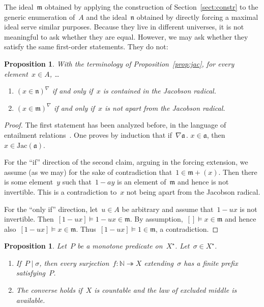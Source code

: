 \documentclass[com,11pt,crcready]{iosart2x}
\theoremstyle{definition}
\theoremstyle{plain}
\newtheorem{proposition}[definition]{Proposition}
\theoremstyle{remark}
\newcommand{\?}{\,{:}\,}
\newcommand{\aaa}{\mathfrak{a}}
\newcommand{\mmm}{\mathfrak{m}}
\newcommand{\nnn}{\mathfrak{n}}
\newcommand{\NN}{\mathbb{N}}
\renewcommand{\_}{\mathpunct{.}\,}
\begin{document}
The ideal~$\mmm$ obtained by applying the construction of Section~\ref{sect:constr} to
the generic enumeration of~$A$ and the ideal~$\nnn$ obtained by directly forcing a
maximal ideal serve similar purposes. Because they live in different universes,
it is not meaningful to ask whether they are equal. However, we may ask whether
they satisfy the same first-order statements. They do not:

\begin{proposition}\label{prop:mmm-nnn}With the terminology of Proposition~\ref{prop:jac}, for
every element~$x \in A$, \ldots \begin{enumerate}
\item $(x \in \nnn)^\nabla$ if and only if~$x$ is contained in the Jacobson
radical.
\item $(x \in \mmm)^\nabla$ if and only if~$x$ is not apart from the Jacobson
radical.
\end{enumerate}
\end{proposition}

\begin{proof}The first statement has been analyzed before, in the language of
entailment relations~\cite[Corollary~2]{schuster-wessel:krull}. One proves by
induction that if~$\nabla\aaa\_ x \in \aaa$, then~$x \in \mathrm{Jac}(\aaa)$.

For the ``if'' direction of the second claim, arguing in the forcing extension,
we assume (as we may) for the sake of contradiction that~$1 \in \mmm + (x)$.
Then there is some element~$y$ such that~$1 - ay$ is an element of~$\mmm$ and
hence is not invertible. This is a contradiction to~$x$ not being apart from
the Jacobson radical.

For the ``only if'' direction, let~$u \in A$ be arbitrary and assume that~$1 -
ux$ is not invertible. Then~$[1-ux] \models 1-ux \in \mmm$. By assumption,~$[]
\models x \in \mmm$ and hence also~$[1-ux] \models x \in \mmm$. Thus~$[1-ux]
\models 1 \in \mmm$, a contradiction.
\end{proof}

\begin{proposition}Let~$P$ be a monotone predicate on~$X^\star$. Let~$\sigma
\in X^\star$.
\begin{enumerate}
\item[\textnormal{(a)}] If~$P \mid \sigma$, then every surjection~$f : \NN
\twoheadrightarrow X$
extending~$\sigma$ has a finite prefix satisfying~$P$.
\item[\textnormal{(b)}] The converse holds if~$X$ is countable and the law of excluded middle
is available.
\end{enumerate}
\end{proposition}
\end{document}
